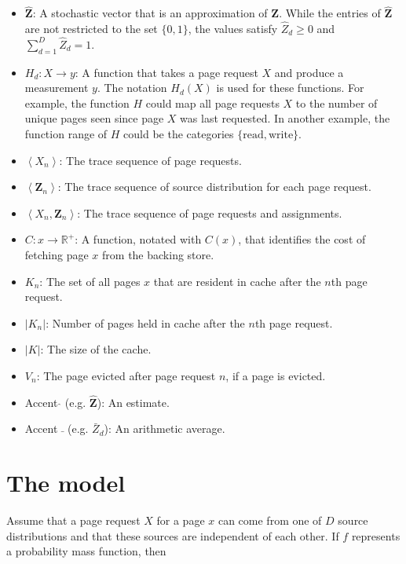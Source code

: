 \begin{itemize}
  \item $\hat{\bm{Z}}$: A stochastic vector that is an approximation of
  $\bm{Z}$. While the entries of $\hat{\bm{Z}}$ are not restricted to the set
  $\{0, 1\}$, the values satisfy $\hat{Z}_d \ge 0$ and $\sum_{d=1}^{D}
  \hat{Z}_{d} = 1$.

  \item $H_d : X \to y$: A function that takes a page request $X$ and produce a
  measurement $y$. The notation $H_d(X)$ is used for these functions. For
  example, the function $H$ could map all page requests $X$ to the number of
  unique pages seen since page $X$ was last requested. In another example, the
  function range of $H$ could be the categories $\{\mbox{read}, \mbox{write}\}$.

  \item $\left< X_n \right>$: The trace sequence of page requests.

  \item $\left< \bm{Z}_n \right>$: The trace sequence of source distribution for
  each page request.

  \item $\left< X_n, \bm{Z}_n \right>$: The trace sequence of page requests and
  assignments.

  \item $C : x \to \mathbb{R^{+}}$: A function, notated with $C(x)$, that
  identifies the cost of fetching page $x$ from the backing store.

  \item $K_n$: The set of all pages $x$ that are resident in cache after the
  $n$th page request.

  \item $|K_n|$: Number of pages held in cache after the $n$th page request.

  \item $|K|$: The size of the cache.

  \item $V_n$: The page evicted after page request $n$, if a page is evicted.

  \item Accent $\hat{}$ (e.g. $\hat{\bm{Z}}$): An estimate.

  \item Accent $\bar{}$ (e.g. $\bar{Z}_d$): An arithmetic average.

  \end{itemize}

\section{The model}
  Assume that a page request $X$ for a page $x$ can come from one of $D$ source
  distributions and that these sources are independent of each other.  If $f$
  represents a probability mass function, then

